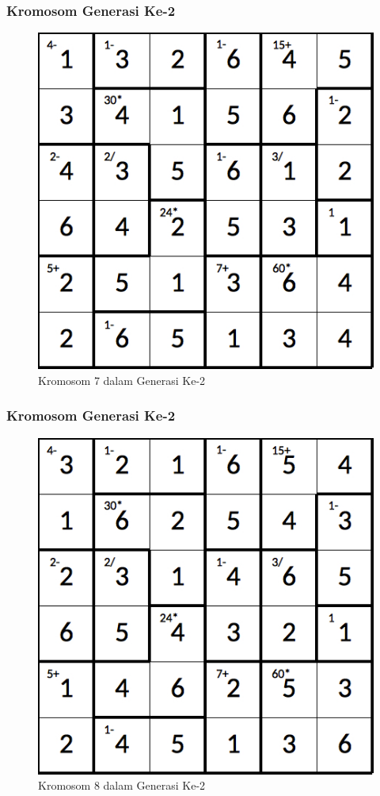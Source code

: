 \documentclass{beamer}
\begin{document}
\begin{frame}
\frametitle{Kromosom Generasi Ke-2}
\begin{figure}
\centering
\captionsetup{justification=centering}
\includegraphics[scale=0.333]{Gambar/hybridgenetic/Generation2Chromosome7}
\caption[Kromosom 7 dalam Generasi Ke-2]{Kromosom 7 dalam Generasi Ke-2}
\label{fig:analisisg2k7}
\end{figure}
\end{frame}

\note{

}

\begin{frame}
\frametitle{Kromosom Generasi Ke-2}
\begin{figure}
\centering
\captionsetup{justification=centering}
\includegraphics[scale=0.333]{Gambar/hybridgenetic/Generation2Chromosome8}
\caption[Kromosom 8 dalam Generasi Ke-2]{Kromosom 8 dalam Generasi Ke-2}
\label{fig:analisisg2k8}
\end{figure}
\end{frame}
\end{document}
